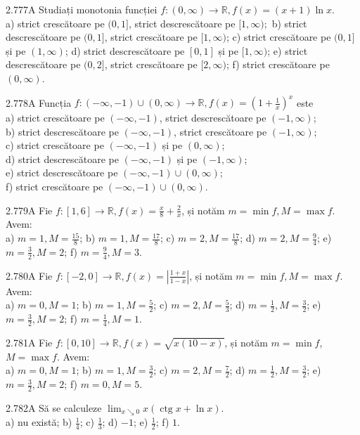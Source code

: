 \documentclass[11pt]{article}
\begin{document}
2.777A Studiați monotonia funcției $f:(0, \infty) \rightarrow \mathbb{R}, f(x)=(x+1) \ln x$.\\ a) strict crescătoare pe $(0,1]$, strict descrescătoare pe $[1, \infty) ;$ b) strict descrescătoare pe $(0,1]$, strict crescătoare pe $[1, \infty)$; c) strict crescătoare pe $(0,1]$ și pe $(1, \infty)$; d) strict descrescătoare pe $[0,1]$ și pe $[1, \infty)$; e) strict descrescătoare pe $(0,2]$, strict crescătoare pe $[2, \infty)$; f) strict crescătoare pe $(0, \infty)$.

2.778A Funcția $f:(-\infty,-1) \cup(0, \infty) \rightarrow \mathbb{R}, f(x)=\left(1+\frac{1}{x}\right)^{x}$ este\\ a) strict crescătoare pe $(-\infty,-1)$, strict descrescătoare pe $(-1, \infty)$;\\ b) strict descrescătoare pe $(-\infty,-1)$, strict crescătoare pe $(-1, \infty)$;\\ c) strict crescătoare pe $(-\infty,-1)$ și pe $(0, \infty)$;\\ d) strict descrescătoare pe $(-\infty,-1)$ și pe $(-1, \infty)$;\\ e) strict descrescătoare pe $(-\infty,-1) \cup(0, \infty)$;\\ f) strict crescătoare pe $(-\infty,-1) \cup(0, \infty)$.

2.779A Fie $f:[1,6] \rightarrow \mathbb{R}, f(x)=\frac{x}{8}+\frac{2}{x}$, și notăm $m=\min f, M=\max f$. Avem:\\ a) $m=1, M=\frac{15}{8}$; b) $m=1, M=\frac{17}{8}$; c) $m=2, M=\frac{17}{8}$; d) $m=2, M=\frac{9}{4}$; e) $m=\frac{3}{2}, M=2$; f) $m=\frac{9}{4}, M=3$.

2.780A Fie $f:[-2,0] \rightarrow \mathbb{R}, f(x)=\left|\frac{1+x}{1-x}\right|$, și notăm $m=\min f, M=\max f$. Avem:\\ a) $m=0, M=1$; b) $m=1, M=\frac{5}{2}$; c) $m=2, M=\frac{5}{3}$; d) $m=\frac{1}{2}, M=\frac{3}{2}$; e) $m=\frac{3}{2}, M=2$; f) $m=\frac{1}{4}, M=1$.

2.781A Fie $f:[0,10] \rightarrow \mathbb{R}, f(x)=\sqrt{x(10-x)}$, și notăm $m=\min f$, $M=\max f$. Avem:\\ a) $m=0, M=1$; b) $m=1, M=\frac{3}{2}$; c) $m=2, M=\frac{7}{2}$; d) $m=\frac{1}{2}, M=\frac{3}{2}$; e) $m=\frac{3}{2}, M=2$; f) $m=0, M=5$.

2.782A Să se calculeze $\lim _{x \searrow 0} x(\operatorname{ctg} x+\ln x)$.\\ a) nu există; b) $\frac{1}{4}$; c) $\frac{1}{3}$; d) $-1$; e) $\frac{1}{2}$; f) $1$.
\end{document}
